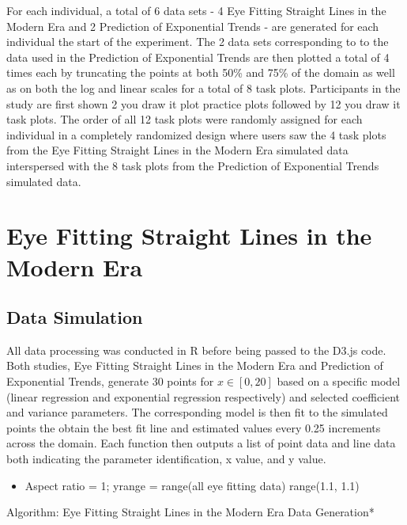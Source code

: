 \documentclass[print]{nuthesis}
\providecommand{\tightlist}{%
  \setlength{\itemsep}{0pt}\setlength{\parskip}{0pt}}
\begin{document}
For each individual, a total of 6 data sets - 4 Eye Fitting Straight Lines in the Modern Era and 2 Prediction of Exponential Trends - are generated for each individual the start of the experiment.
The 2 data sets corresponding to to the data used in the Prediction of Exponential Trends are then plotted a total of 4 times each by truncating the points at both 50\% and 75\% of the domain as well as on both the log and linear scales for a total of 8 task plots.
Participants in the study are first shown 2 you draw it plot practice plots followed by 12 you draw it task plots.
The order of all 12 task plots were randomly assigned for each individual in a completely randomized design where users saw the 4 task plots from the Eye Fitting Straight Lines in the Modern Era simulated data interspersed with the 8 task plots from the Prediction of Exponential Trends simulated data.

\hypertarget{eye-fitting-straight-lines-in-the-modern-era}{%
\section{Eye Fitting Straight Lines in the Modern Era}\label{eye-fitting-straight-lines-in-the-modern-era}}

\hypertarget{data-simulation}{%
\subsection{Data Simulation}\label{data-simulation}}

All data processing was conducted in R before being passed to the D3.js code.
Both studies, Eye Fitting Straight Lines in the Modern Era and Prediction of Exponential Trends, generate 30 points for \(x\in [0, 20]\) based on a specific model (linear regression and exponential regression respectively) and selected coefficient and variance parameters.
The corresponding model is then fit to the simulated points the obtain the best fit line and estimated values every 0.25 increments across the domain.
Each function then outputs a list of point data and line data both indicating the parameter identification, x value, and y value.

\begin{itemize}
\tightlist
\item
  Aspect ratio = 1; yrange = range(all eye fitting data) range(1.1, 1.1)
\end{itemize}

\noindent *Algorithm: Eye Fitting Straight Lines in the Modern Era Data Generation*
\end{document}
